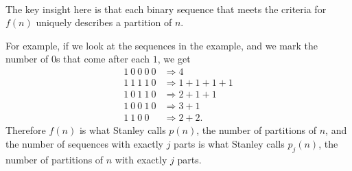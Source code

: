 \documentclass{article}
\newenvironment{solution}[1][Solution.]{\begin{trivlist}
\item[\hskip \labelsep {\bfseries #1}]}{\end{trivlist}}
\begin{document}
\begin{solution} \text{} \\
  The key insight here is that each binary sequence that meets the criteria
  for $f(n)$ uniquely describes a partition of $n$.

  For example, if we look at the sequences in the example, and we mark the
  number of $0$s that come after each $1$, we get \begin{align}
    1\ 0\ 0\ 0\ 0 &\Rightarrow 4 \\
    1\ 1\ 1\ 1\ 0 &\Rightarrow 1 + 1 + 1 + 1 \\
    1\ 0\ 1\ 1\ 0 &\Rightarrow 2 + 1 + 1 \\
    1\ 0\ 0\ 1\ 0 &\Rightarrow 3 + 1 \\
    1\ 1\ 0\ 0    &\Rightarrow 2 + 2.
  \end{align}
  Therefore $f(n)$ is what Stanley calls $p(n)$, the number of partitions of
  $n$, and the number of sequences with exactly $j$ parts is what Stanley calls
  $p_j(n)$, the number of partitions of $n$ with exactly $j$ parts.
\end{solution}
\end{document}
